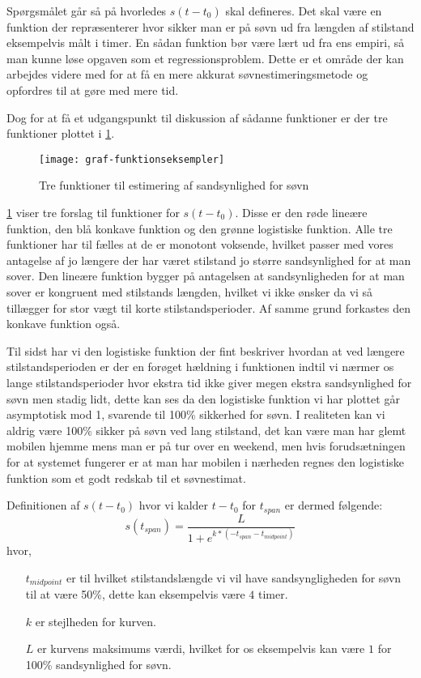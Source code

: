 Spørgsmålet går så på hvorledes $s(t-t_0)$ skal defineres.
Det skal være en funktion der repræsenterer hvor sikker man er på søvn ud fra længden af stilstand eksempelvis målt i timer.
En sådan funktion bør være lært ud fra ens empiri, så man kunne løse opgaven som et regressionsproblem.
Dette er et område der kan arbejdes videre med for at få en mere akkurat søvnestimeringsmetode og opfordres til at gøre med mere tid.

Dog for at få et udgangspunkt til diskussion af sådanne funktioner er der tre funktioner plottet i \cref{fig:trefunc}.
\begin{figure}[h]
	\centering
	\texttt{[image: graf-funktionseksempler]}
	\caption{Tre funktioner til estimering af sandsynlighed for søvn}\label{fig:trefunc}
\end{figure}

\cref{fig:trefunc} viser tre forslag til funktioner for $s(t-t_0)$.
Disse er den røde lineære funktion, den blå konkave funktion og den grønne logistiske funktion.
Alle tre funktioner har til fælles at de er monotont voksende, hvilket passer med vores antagelse af jo længere der har været stilstand jo større sandsynlighed for at man sover.
Den lineære funktion bygger på antagelsen at sandsynligheden for at man sover er kongruent med stilstands længden, hvilket vi ikke ønsker da vi så tillægger for stor vægt til korte stilstandsperioder.
Af samme grund forkastes den konkave funktion også.

Til sidst har vi den logistiske funktion der fint beskriver hvordan at ved længere stilstandsperioden er der en forøget hældning i funktionen indtil vi nærmer os lange stilstandsperioder hvor ekstra tid ikke giver megen ekstra sandsynlighed for søvn men stadig lidt, dette kan ses da den logistiske funktion vi har plottet går asymptotisk mod 1, svarende til 100\% sikkerhed for søvn.
I realiteten kan vi aldrig være 100\% sikker på søvn ved lang stilstand, det kan være man har glemt mobilen hjemme mens man er på tur over en weekend, men hvis forudsætningen for at systemet fungerer er at man har mobilen i nærheden regnes den logistiske funktion som et godt redskab til et søvnestimat.

Definitionen af $s(t-t_0)$ hvor vi kalder $t-t_0$ for $t_{span}$ er dermed følgende:
\begin{equation}
	s(t_{span}) = \frac{L}{1+e^{k*(-t_{span} - t_{midpoint})}}
\end{equation} 
hvor,
\begin{itemize}
	\item[$t_{midpoint}$] er til hvilket stilstandslængde vi vil have sandsyngligheden for søvn til at være 50\%, dette kan eksempelvis være $4$ timer.
	\item[$k$] er stejlheden for kurven.
	\item[$L$] er kurvens maksimums værdi, hvilket for os eksempelvis kan være $1$ for 100\% sandsynlighed for søvn.
\end{itemize}

